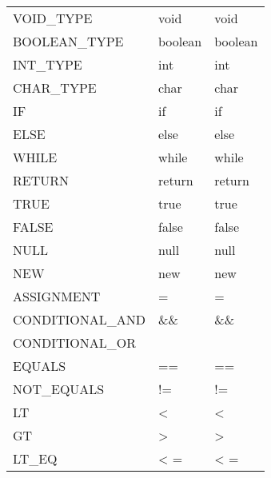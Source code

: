 \documentclass [a4paper,abstracton,titlepage]{scrartcl}
\begin{document}
\begin{longtable}{l | l | l}
VOID\_{}TYPE       &
void                                        &
void %
 \tabularnewline

BOOLEAN\_{}TYPE    &
boolean                                     &
boolean %
 \tabularnewline

INT\_{}TYPE        &
int                                         &
int %
 \tabularnewline

CHAR\_{}TYPE       &
char                                        &
char %
 \tabularnewline

IF              &
if                                          &
if %
 \tabularnewline

ELSE            &
else                                        &
else %
 \tabularnewline

WHILE           &
while                                       &
while %
 \tabularnewline

RETURN          &
return                                      &
return %
 \tabularnewline

TRUE            &
true                                        &
true %
 \tabularnewline

FALSE           &
false                                       &
false %
 \tabularnewline

NULL            &
null                                        &
null %
 \tabularnewline

NEW             &
new                                         &
new %
 \tabularnewline

ASSIGNMENT      &
=                                           &
= %
 \tabularnewline

CONDITIONAL\_{}AND &
\&{}\&{}                                          &
\&{}\&{} %
 \tabularnewline

CONDITIONAL\_{}OR  &
\textbar{}\textbar{}                                        &
\textbar{}\textbar{} %
 \tabularnewline

EQUALS          &
==                                          &
== %
 \tabularnewline

NOT\_{}EQUALS      &
!=                                          &
!= %
 \tabularnewline

LT              &
\textless{}                                           &
\textless{} %
 \tabularnewline

GT              &
\textgreater{}                                           &
\textgreater{} %
 \tabularnewline

LT\_{}EQ           &
\textless{} =                                         &
\textless{} = %
 \tabularnewline


\end{longtable}
\end{document}

